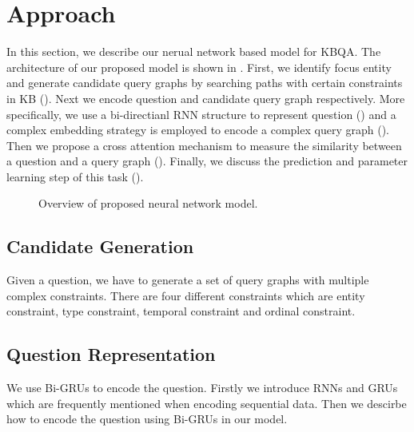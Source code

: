 \section{Approach}

In this section, we describe our nerual network based model for KBQA. The architecture of our proposed model is shown in . First, we identify focus entity and generate candidate query graphs by searching paths with certain constraints in KB (). Next we encode question and candidate query graph respectively. 
More specifically, we use a bi-directianl RNN structure to represent question () and a complex embedding strategy is employed to encode a complex query graph (). Then we propose a cross attention mechanism to measure the similarity between a question and a query graph (). Finally, we discuss the prediction and parameter learning step of this task ().


\begin{figure*}
	\centering
	\caption{Overview of proposed neural network model.}
	\label{fig:overview}
\end{figure*}


\subsection{Candidate Generation}
\label{sec:candgen}

Given a question, we have to generate a set of query graphs with multiple complex constraints. There are four different constraints which are entity constraint, type constraint, temporal constraint and ordinal constraint. 





\subsection{Question Representation}
\label{sec:q-encoding}

We use Bi-GRUs to encode the question. Firstly we introduce RNNs and GRUs which are frequently mentioned when encoding sequential data. Then we descirbe how to encode the question using Bi-GRUs in our model.

